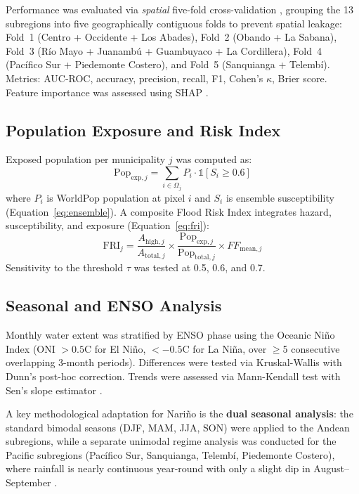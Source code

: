 \documentclass{article}
\begin{document}
Performance was evaluated via \textit{spatial} five-fold cross-validation \citep{Roberts2017}, grouping the 13 subregions into five geographically contiguous folds to prevent spatial leakage: Fold~1 (Centro + Occidente + Los Abades), Fold~2 (Obando + La Sabana), Fold~3 (R\'io Mayo + Juanamb\'u + Guambuyaco + La Cordillera), Fold~4 (Pac\'ifico Sur + Piedemonte Costero), and Fold~5 (Sanquianga + Telemb\'i). Metrics: AUC-ROC, accuracy, precision, recall, F1, Cohen's $\kappa$, Brier score. Feature importance was assessed using SHAP \citep{Lundberg2017}.

\subsection{Population Exposure and Risk Index}

Exposed population per municipality $j$ was computed as:
\begin{equation}
    \text{Pop}_{\text{exp},j} = \sum_{i \in \Omega_j} P_i \cdot \mathbb{1}[S_i \geq 0.6]
    \label{eq:pop_exposure}
\end{equation}
where $P_i$ is WorldPop population at pixel $i$ and $S_i$ is ensemble susceptibility (Equation~\ref{eq:ensemble}). A composite Flood Risk Index integrates hazard, susceptibility, and exposure (Equation~\ref{eq:fri}):
\begin{equation}
    \text{FRI}_j = \frac{A_{\text{high},j}}{A_{\text{total},j}} \times \frac{\text{Pop}_{\text{exp},j}}{\text{Pop}_{\text{total},j}} \times FF_{\text{mean},j}
    \label{eq:fri}
\end{equation}
Sensitivity to the threshold $\tau$ was tested at 0.5, 0.6, and 0.7.

\subsection{Seasonal and ENSO Analysis}

Monthly water extent was stratified by ENSO phase using the Oceanic Ni\~no Index (ONI $> 0.5$\textdegree{}C for El Ni\~no, $< -0.5$\textdegree{}C for La Ni\~na, over $\geq$5 consecutive overlapping 3-month periods). Differences were tested via Kruskal-Wallis with Dunn's post-hoc correction. Trends were assessed via Mann-Kendall test \citep{Mann1945} with Sen's slope estimator \citep{Sen1968}.

A key methodological adaptation for Nari\~no is the \textbf{dual seasonal analysis}: the standard bimodal seasons (DJF, MAM, JJA, SON) were applied to the Andean subregions, while a separate unimodal regime analysis was conducted for the Pacific subregions (Pac\'ifico Sur, Sanquianga, Telemb\'i, Piedemonte Costero), where rainfall is nearly continuous year-round with only a slight dip in August--September \citep{Urrea2019}.
\end{document}
